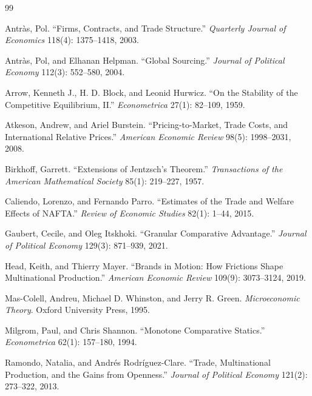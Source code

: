 \documentclass[11pt]{article}
\theoremstyle{definition}
\theoremstyle{remark}
\begin{document}
\setlength{\bibsep}{1pt}
\begin{thebibliography}{99}

Antr\`as, Pol. ``Firms, Contracts, and Trade Structure.'' \emph{Quarterly Journal of
Economics} 118(4): 1375--1418, 2003.

Antr\`as, Pol, and Elhanan Helpman. ``Global Sourcing.'' \emph{Journal of Political
Economy} 112(3): 552--580, 2004.

Arrow, Kenneth J., H. D. Block, and Leonid Hurwicz. ``On the Stability of the
Competitive Equilibrium, II.'' \emph{Econometrica} 27(1): 82--109, 1959.

Atkeson, Andrew, and Ariel Burstein. ``Pricing-to-Market, Trade Costs, and
International Relative Prices.'' \emph{American Economic Review} 98(5): 1998--2031,
2008.

Birkhoff, Garrett. ``Extensions of Jentzsch's Theorem.'' \emph{Transactions of the
American Mathematical Society} 85(1): 219--227, 1957.

Caliendo, Lorenzo, and Fernando Parro. ``Estimates of the Trade and Welfare Effects of
NAFTA.'' \emph{Review of Economic Studies} 82(1): 1--44, 2015.

Gaubert, Cecile, and Oleg Itskhoki. ``Granular Comparative Advantage.''
\emph{Journal of Political Economy} 129(3): 871--939, 2021.

Head, Keith, and Thierry Mayer. ``Brands in Motion: How Frictions Shape Multinational
Production.'' \emph{American Economic Review} 109(9): 3073--3124, 2019.

Mas-Colell, Andreu, Michael D. Whinston, and Jerry R. Green. \emph{Microeconomic
Theory}. Oxford University Press, 1995.

Milgrom, Paul, and Chris Shannon. ``Monotone Comparative Statics.''
\emph{Econometrica} 62(1): 157--180, 1994.

Ramondo, Natalia, and Andr\'es Rodr\'iguez-Clare. ``Trade, Multinational Production,
and the Gains from Openness.'' \emph{Journal of Political Economy} 121(2): 273--322,
2013.


\end{thebibliography}
\end{document}
